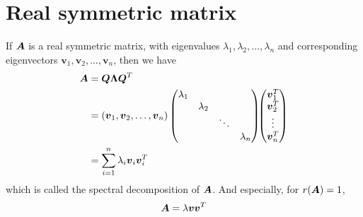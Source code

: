 \documentclass{overview}
\begin{document}
\section{Real symmetric matrix}

If $\boldsymbol{A}$ is a real symmetric matrix, with eigenvalues $\lambda_1, \lambda_2, \dots, \lambda_n$
and corresponding eigenvectors $\boldsymbol{v}_1, \boldsymbol{v}_2, \dots, \boldsymbol{v}_n$,
then we have
\[
	\begin{aligned}
		\boldsymbol{A}&=\boldsymbol{Q}\boldsymbol{\Lambda}\boldsymbol{Q}^{T} \\
			&=(\boldsymbol{v}_1, \boldsymbol{v}_2, \dots, \boldsymbol{v}_n)
			\begin{pmatrix}
				\lambda_1 & &  \\
				& \lambda_2 & \\
				 & & \ddots & \\
				& & & \lambda_n \\
			\end{pmatrix}\!\!
			\begin{pmatrix}
				\boldsymbol{v}_1^{T} \\
				\boldsymbol{v}_2^{T} \\
				\vdots \\
				\boldsymbol{v}_n^{T} \\
			\end{pmatrix} \\
			&=\sum_{i=1}^{n} \lambda_i \boldsymbol{v}_i \boldsymbol{v}_i^{T} \\
	\end{aligned}
\] 
which is called the spectral decomposition of $\boldsymbol{A}$. And especially, for $r(\boldsymbol{A})=1$,
\[	\boldsymbol{A} = \lambda \boldsymbol{v} \boldsymbol{v}^{T} \]
\end{document}
